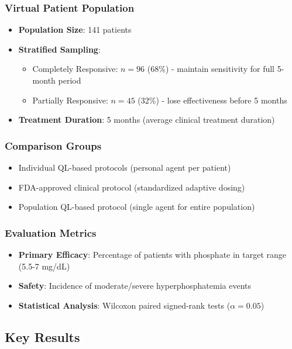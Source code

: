 \subsubsection{Virtual Patient Population}
\begin{itemize}
    \item \textbf{Population Size}: 141 patients
    \item \textbf{Stratified Sampling}:
    \begin{itemize}
        \item Completely Responsive: $n=96$ (68\%) - maintain sensitivity for full 5-month period
        \item Partially Responsive: $n=45$ (32\%) - lose effectiveness before 5 months
    \end{itemize}
    \item \textbf{Treatment Duration}: 5 months (average clinical treatment duration)
\end{itemize}

\subsubsection{Comparison Groups}
\begin{itemize}
    \item Individual QL-based protocols (personal agent per patient)
    \item FDA-approved clinical protocol (standardized adaptive dosing)
    \item Population QL-based protocol (single agent for entire population)
\end{itemize}

\subsubsection{Evaluation Metrics}
\begin{itemize}
    \item \textbf{Primary Efficacy}: Percentage of patients with phosphate in target range (5.5-7 mg/dL)
    \item \textbf{Safety}: Incidence of moderate/severe hyperphosphatemia events
    \item \textbf{Statistical Analysis}: Wilcoxon paired signed-rank tests ($\alpha = 0.05$)
\end{itemize}

\subsection{Key Results}

